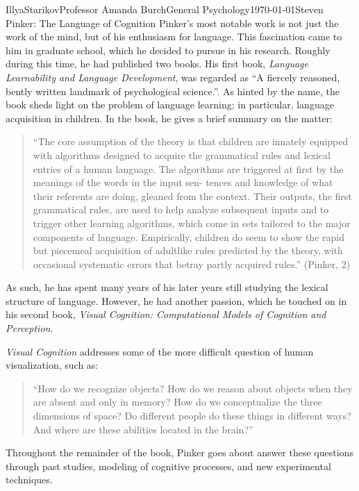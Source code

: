 \documentclass[12pt,letterpaper]{article}
\begin{document}
\begin{mla}{Illya}{Starikov}{Professor Amanda Burch}{General Psychology}{\today}{Steven Pinker: The Language of Cognition}
Pinker's most notable work is not just the work of the mind, but of his enthusiasm for language. This fascination came to him in graduate school, which he decided to pursue in his research. Roughly during this time, he had published two books. His first book, \textit{Language Learnability and Language Development}, was regarded as ``A fiercely reasoned, bently written landmark of psychological science.''. As hinted by the name, the book sheds light on the problem of language learning; in particular, language acquisition in children. In the book, he gives a brief summary on the matter:

\begin{quotation}
``The core assumption of the theory is that children are innately equipped with algorithms designed to acquire the grammatical rules and lexical entries of a human language. The algorithms are triggered at first by the meanings of the words in the input sen- tences and knowledge of what their referents are doing, gleaned from the context. Their outputs, the first grammatical rules, are used to help analyze subsequent inputs and to trigger other learning algorithms, which come in sets tailored to the major components of language. Empirically, children do seem to show the rapid but piecemeal acquisition of adultlike rules predicted by the theory, with occasional systematic errors that betray partly acquired rules.'' (Pinker, 2)
\end{quotation}

\noindent As such, he has spent many years of his later years still studying the lexical structure of language. However, he had another passion, which he touched on in his second book, \textit{Visual Cognition: Computational Models of Cognition and Perception}.

\textit{Visual Cognition} addresses some of the more difficult question of human visualization, such as:

\begin{quotation}
``How do we recognize objects? How do we reason about objects when they are absent and only in memory? How do we conceptualize the three dimensions of space? Do different people do these things in different ways? And where are these abilities located in the brain?''
\end{quotation}

\noindent Throughout the remainder of the book, Pinker goes about answer these questions through past studies, modeling of cognitive processes, and new experimental techniques.


\end{mla}
\end{document}
